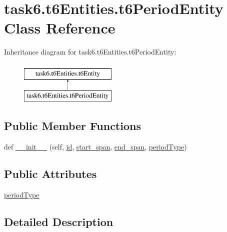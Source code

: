 \hypertarget{classtask6_1_1t6Entities_1_1t6PeriodEntity}{}\section{task6.\+t6\+Entities.\+t6\+Period\+Entity Class Reference}
\label{classtask6_1_1t6Entities_1_1t6PeriodEntity}
Inheritance diagram for task6.\+t6\+Entities.\+t6\+Period\+Entity\+:\begin{figure}[H]
\begin{center}
\leavevmode
\includegraphics[height=2.000000cm]{classtask6_1_1t6Entities_1_1t6PeriodEntity}
\end{center}
\end{figure}
\subsection*{Public Member Functions}
\begin{DoxyCompactItemize}
\item 
def \hyperlink{classtask6_1_1t6Entities_1_1t6PeriodEntity_a447a8538b93c2116de30aa47eccfcbec}{\+\_\+\+\_\+init\+\_\+\+\_\+} (self, \hyperlink{classtask6_1_1t6Entities_1_1t6Entity_a96b2e7fb553c920ab2db6f6deb31e3b4}{id}, \hyperlink{classtask6_1_1t6Entities_1_1t6Entity_a8221c36d2995a24200cdfbd74cc9233c}{start\+\_\+span}, \hyperlink{classtask6_1_1t6Entities_1_1t6Entity_a597d42bb02fc9f42277098f0ce21917c}{end\+\_\+span}, \hyperlink{classtask6_1_1t6Entities_1_1t6PeriodEntity_ae2f4d463fe5601083ce5ce3070690f1d}{period\+Type})
\end{DoxyCompactItemize}
\subsection*{Public Attributes}
\begin{DoxyCompactItemize}
\item 
\hyperlink{classtask6_1_1t6Entities_1_1t6PeriodEntity_ae2f4d463fe5601083ce5ce3070690f1d}{period\+Type}
\end{DoxyCompactItemize}


\subsection{Detailed Description}


